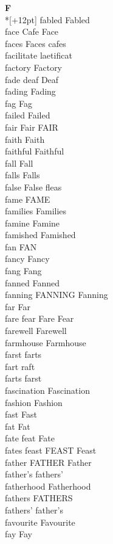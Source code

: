 \vspace{14pt}
\noindent\textbf{\Large F}\\*[+12pt]
fabled Fabled\\
face Cafe Face\\
faces Faces cafes\\
facilitate laetificat\\
factory Factory\\
fade deaf Deaf\\
fading Fading\\
fag Fag\\
failed Failed\\
fair Fair FAIR\\
faith Faith\\
faithful Faithful\\
fall Fall\\
falls Falls\\
false False fleas\\
fame FAME\\
families Families\\
famine Famine\\
famished Famished\\
fan FAN\\
fancy Fancy\\
fang Fang\\
fanned Fanned\\
fanning FANNING Fanning\\
far Far\\
fare fear Fare Fear\\
farewell Farewell\\
farmhouse Farmhouse\\
farst farts\\
fart raft\\
farts farst\\
fascination Fascination\\
fashion Fashion\\
fast Fast\\
fat Fat\\
fate feat Fate\\
fates feast FEAST Feast\\
father FATHER Father\\
father's fathers'\\
fatherhood Fatherhood\\
fathers FATHERS\\
fathers' father's\\
favourite Favourite\\
fay Fay\\
